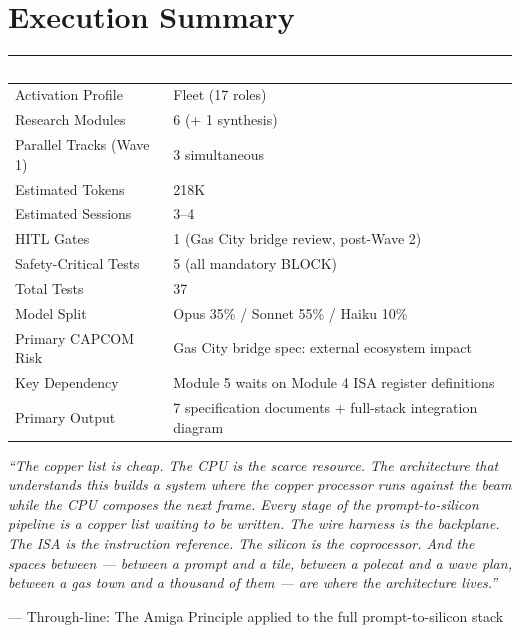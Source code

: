 \documentclass[11pt,letterpaper]{article}
\newcommand{\tableheader}[1]{\textbf{\sffamily\textcolor{white}{#1}}}
\begin{document}
\section{Execution Summary}

\begin{center}
\begin{tabularx}{\textwidth}{L{5cm}X}
\toprule
{}
\tableheader{Metric} & \tableheader{Value} \\
\midrule
Activation Profile & Fleet (17 roles) \\
Research Modules & 6 (+ 1 synthesis) \\
Parallel Tracks (Wave 1) & 3 simultaneous \\
Estimated Tokens & 218K \\
Estimated Sessions & 3--4 \\
HITL Gates & 1 (Gas City bridge review, post-Wave 2) \\
Safety-Critical Tests & 5 (all mandatory BLOCK) \\
Total Tests & 37 \\
Model Split & Opus 35\% / Sonnet 55\% / Haiku 10\% \\
Primary CAPCOM Risk & Gas City bridge spec: external ecosystem impact \\
Key Dependency & Module 5 waits on Module 4 ISA register definitions \\
Primary Output & 7 specification documents + full-stack integration diagram \\
\bottomrule
\end{tabularx}
\end{center}

\vspace{2em}

\begin{quotebox}
\textit{``The copper list is cheap. The CPU is the scarce resource. The architecture that understands this builds a system where the copper processor runs against the beam while the CPU composes the next frame. Every stage of the prompt-to-silicon pipeline is a copper list waiting to be written. The wire harness is the backplane. The ISA is the instruction reference. The silicon is the coprocessor. And the spaces between --- between a prompt and a tile, between a polecat and a wave plan, between a gas town and a thousand of them --- are where the architecture lives.''}

\vspace{0.8em}
{\small\sffamily\textcolor{primary}{--- Through-line: The Amiga Principle applied to the full prompt-to-silicon stack}}
\end{quotebox}
\end{document}
